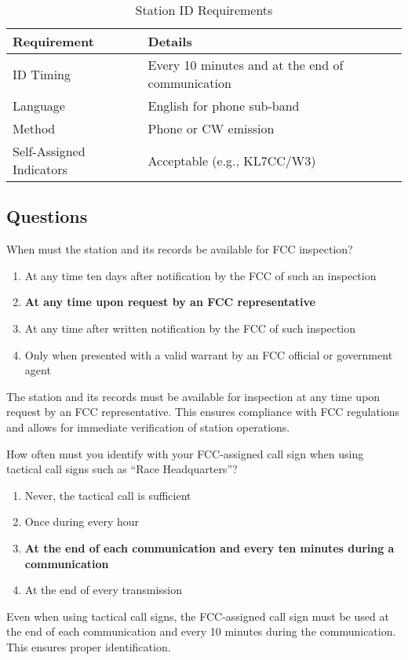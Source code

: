 \begin{table}[h!]
    \centering
    \caption{Station ID Requirements}
    \label{tab:id_requirements}
    \begin{tabular}{|l|l|}
        \hline
        \textbf{Requirement} & \textbf{Details} \\
        \hline
        ID Timing & Every 10 minutes and at the end of communication \\
        Language & English for phone sub-band \\
        Method & Phone or CW emission \\
        Self-Assigned Indicators & Acceptable (e.g., KL7CC/W3) \\
        \hline
    \end{tabular}
\end{table}

\subsection*{Questions}
\begin{tcolorbox}[colback=gray!10!white,colframe=black!75!black,title={T1F01}]
    When must the station and its records be available for FCC inspection?
    \begin{enumerate}[label=\Alph*),noitemsep]
        \item At any time ten days after notification by the FCC of such an inspection
        \item \textbf{At any time upon request by an FCC representative}
        \item At any time after written notification by the FCC of such inspection
        \item Only when presented with a valid warrant by an FCC official or government agent
    \end{enumerate}
\end{tcolorbox}
The station and its records must be available for inspection at any time upon request by an FCC representative. This ensures compliance with FCC regulations and allows for immediate verification of station operations.


\begin{tcolorbox}[colback=gray!10!white,colframe=black!75!black,title={T1F02}]
    How often must you identify with your FCC-assigned call sign when using tactical call signs such as “Race Headquarters”?
    \begin{enumerate}[label=\Alph*),noitemsep]
        \item Never, the tactical call is sufficient
        \item Once during every hour
        \item \textbf{At the end of each communication and every ten minutes during a communication}
        \item At the end of every transmission
    \end{enumerate}
\end{tcolorbox}
Even when using tactical call signs, the FCC-assigned call sign must be used at the end of each communication and every 10 minutes during the communication. This ensures proper identification.

